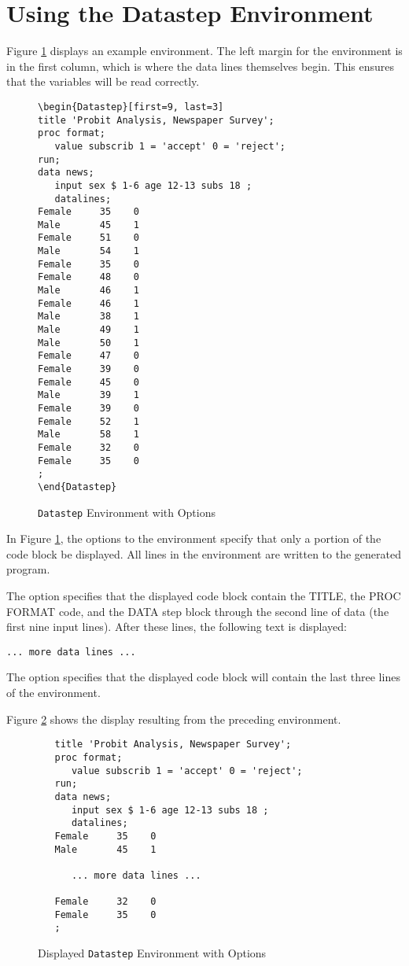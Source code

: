 \documentclass[article,oneside]{memoir}
\begin{document}
\section{Using the Datastep Environment}\label{dsex}

  Figure \ref{fig:sd2} displays an example  environment. The left margin for
  the environment is in the first column, which is where the data lines themselves begin.
  This ensures that the variables will be read correctly.

\begin{figure}[H]
\begin{snugshade}
\begin{verbatim}
\begin{Datastep}[first=9, last=3]
title 'Probit Analysis, Newspaper Survey';
proc format;
   value subscrib 1 = 'accept' 0 = 'reject';
run;
data news;
   input sex $ 1-6 age 12-13 subs 18 ;
   datalines;
Female     35    0
Male       45    1
Female     51    0
Male       54    1
Female     35    0
Female     48    0
Male       46    1
Female     46    1
Male       38    1
Male       49    1
Male       50    1
Female     47    0
Female     39    0
Female     45    0
Male       39    1
Female     39    0
Female     52    1
Male       58    1
Female     32    0
Female     35    0
;
\end{Datastep}
\end{verbatim}
\end{snugshade}
\caption{\texttt{Datastep} Environment with Options}\label{fig:sd2}
\end{figure}

  In Figure \ref{fig:sd2}, the options to the  environment specify that only a portion
  of the code block be displayed.  All lines in the environment are written to the
  generated program.

  The option  specifies that the displayed code
  block contain the TITLE, the PROC FORMAT code, and the DATA step block through the
  second line of data (the first nine input lines). After these lines, the
  following text is displayed:\par\texttt{... more data lines ...}

  The option  specifies that the displayed code block
  will contain the last three lines of the environment.

  Figure \ref{fig:sd3} shows the display resulting from the preceding
 environment.
\begin{figure}[H]
\begin{snugshade}
\begin{verbatim}
   title 'Probit Analysis, Newspaper Survey';
   proc format;
      value subscrib 1 = 'accept' 0 = 'reject';
   run;
   data news;
      input sex $ 1-6 age 12-13 subs 18 ;
      datalines;
   Female     35    0
   Male       45    1

      ... more data lines ...

   Female     32    0
   Female     35    0
   ;
\end{verbatim}
\end{snugshade}
\caption{Displayed \texttt{Datastep} Environment with Options}\label{fig:sd3}
\end{figure}
\end{document}
